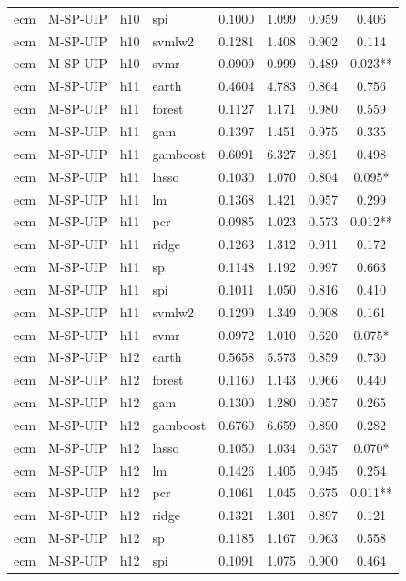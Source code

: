 \begin{ThreePartTable}
\begin{longtable}[t]{llclcccc}
ecm & M-SP-UIP & h10 & spi & 0.1000 & 1.099 & 0.959 & 0.406\\
ecm & M-SP-UIP & h10 & svmlw2 & 0.1281 & 1.408 & 0.902 & 0.114\\
ecm & M-SP-UIP & h10 & svmr & 0.0909 & 0.999 & 0.489 & 0.023**\\
\addlinespace
ecm & M-SP-UIP & h11 & earth & 0.4604 & 4.783 & 0.864 & 0.756\\
ecm & M-SP-UIP & h11 & forest & 0.1127 & 1.171 & 0.980 & 0.559\\
ecm & M-SP-UIP & h11 & gam & 0.1397 & 1.451 & 0.975 & 0.335\\
ecm & M-SP-UIP & h11 & gamboost & 0.6091 & 6.327 & 0.891 & 0.498\\
ecm & M-SP-UIP & h11 & lasso & 0.1030 & 1.070 & 0.804 & 0.095*\\
ecm & M-SP-UIP & h11 & lm & 0.1368 & 1.421 & 0.957 & 0.299\\
ecm & M-SP-UIP & h11 & pcr & 0.0985 & 1.023 & 0.573 & 0.012**\\
ecm & M-SP-UIP & h11 & ridge & 0.1263 & 1.312 & 0.911 & 0.172\\
ecm & M-SP-UIP & h11 & sp & 0.1148 & 1.192 & 0.997 & 0.663\\
ecm & M-SP-UIP & h11 & spi & 0.1011 & 1.050 & 0.816 & 0.410\\
ecm & M-SP-UIP & h11 & svmlw2 & 0.1299 & 1.349 & 0.908 & 0.161\\
ecm & M-SP-UIP & h11 & svmr & 0.0972 & 1.010 & 0.620 & 0.075*\\
\addlinespace
ecm & M-SP-UIP & h12 & earth & 0.5658 & 5.573 & 0.859 & 0.730\\
ecm & M-SP-UIP & h12 & forest & 0.1160 & 1.143 & 0.966 & 0.440\\
ecm & M-SP-UIP & h12 & gam & 0.1300 & 1.280 & 0.957 & 0.265\\
ecm & M-SP-UIP & h12 & gamboost & 0.6760 & 6.659 & 0.890 & 0.282\\
ecm & M-SP-UIP & h12 & lasso & 0.1050 & 1.034 & 0.637 & 0.070*\\
ecm & M-SP-UIP & h12 & lm & 0.1426 & 1.405 & 0.945 & 0.254\\
ecm & M-SP-UIP & h12 & pcr & 0.1061 & 1.045 & 0.675 & 0.011**\\
ecm & M-SP-UIP & h12 & ridge & 0.1321 & 1.301 & 0.897 & 0.121\\
ecm & M-SP-UIP & h12 & sp & 0.1185 & 1.167 & 0.963 & 0.558\\
ecm & M-SP-UIP & h12 & spi & 0.1091 & 1.075 & 0.900 & 0.464\\

\end{longtable}
\end{ThreePartTable}

